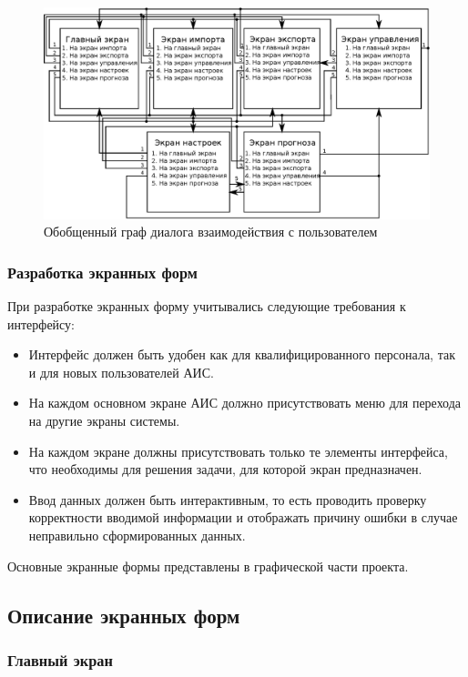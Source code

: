 \clearpage
\begin{figure}[h!]
\centering
\includegraphics[angle=90,origin=c]{technology/dialog_generic}
\caption{Обобщенный граф диалога взаимодействия с пользователем}
\label{figure:dialog_generic}
\end{figure}

\clearpage
\subsubsection{Разработка экранных форм}

При разработке экранных форму учитывались следующие требования к интерфейсу:
\begin{itemize}
\item Интерфейс должен быть удобен как для квалифицированного персонала, так и для новых пользователей АИС.
\item На каждом основном экране АИС должно присутствовать меню для перехода на другие экраны системы.
\item На каждом экране должны присутствовать только те элементы интерфейса, что необходимы для решения задачи, для которой экран предназначен.
\item Ввод данных должен быть интерактивным, то есть проводить проверку корректности вводимой информации и отображать причину ошибки в случае неправильно сформированных данных.
\end{itemize}

Основные экранные формы представлены в графической части проекта.

\clearpage
\subsection{Описание экранных форм}

\subsubsection{Главный экран}

